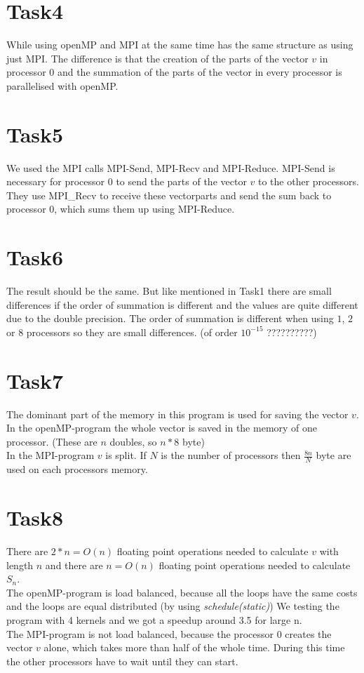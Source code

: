 \documentclass[11pt,titlepage] {article}
\begin{document}
\section{Task4}
While using openMP and MPI at the same time has the same structure as using just MPI. The difference is that the creation of the parts of the vector $v$ in processor $0$ and the summation of the parts of the vector in every processor is parallelised with openMP.

\section{Task5}
We used the MPI calls MPI-Send, MPI-Recv and MPI-Reduce.
MPI-Send is necessary for processor $0$ to send the parts of the vector $v$ to the other processors. They use MPI_Recv to receive these vectorparts and send the sum back to processor $0$, which sums them up using MPI-Reduce.

\section{Task6}
The result should be the same. But like mentioned in Task1 there are small differences if the order of summation is different and the values are quite different due to the double precision. The order of summation is different when using $1$, $2$ or $8$ processors so they are small differences. (of order  $10^{-15}$   ??????????)

\section{Task7}
The dominant part of the memory in this program is used for saving the vector $v$. In the openMP-program the whole vector is saved in the memory of one processor. (These are $n$ doubles, so $n*8$ byte)\\
In the MPI-program $v$ is split. If $N$ is the number of processors then $\frac{8n}{N}$ byte are used on each processors memory.

\section{Task8}
There are $2*n=O(n)$ floating point operations needed to calculate $v$ with length $n$ and there are $n=O(n)$ floating point operations needed to calculate $S_n$.\\
The openMP-program is load balanced, because all the loops have the same costs and the loops are equal distributed (by using \textit{schedule(static)}) We testing the program with 4 kernels and we got a speedup around 3.5 for large n.\\
The MPI-program is not load balanced, because the processor $0$ creates the vector $v$ alone, which takes more than half of the whole time. During this time the other processors have to wait until they can start. 
\end{document}
